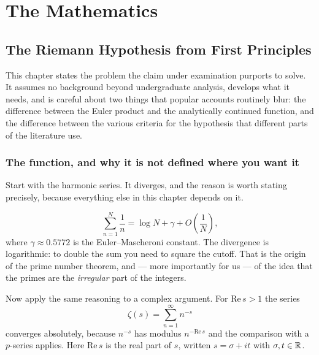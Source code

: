 
\part{The Mathematics}
\label{part:math}

\chapter{The Riemann Hypothesis from First Principles}
\label{ch:rh}

This chapter states the problem the claim under examination purports to solve.
It assumes no background beyond undergraduate analysis, develops what it needs,
and is careful about two things that popular accounts routinely blur: the
difference between the Euler product and the analytically continued function,
and the difference between the various criteria for the hypothesis that different
parts of the literature use.

\section{The function, and why it is not defined where you want it}Start with the harmonic series. It diverges, and the reason is worth stating
precisely, because everything else in this chapter depends on it.

\begin{equation}
\sum_{n=1}^{N} \frac{1}{n} = \log N + \gamma + O\!\left(\frac{1}{N}\right),
\label{eq:harmonic}
\end{equation}
where $\gamma \approx 0.5772$ is the Euler--Mascheroni constant. The
divergence is logarithmic: to double the sum you need to square the cutoff.
That is the origin of the prime number theorem, and --- more importantly for
us --- of the idea that the primes are the \emph{irregular} part of the integers.

Now apply the same reasoning to a complex argument. For $\mathrm{Re}\,  s > 1$ the series
\begin{equation}
\zeta(s) = \sum_{n=1}^{\infty} n^{-s}
\label{eq:zeta-series}
\end{equation}
converges absolutely, because $n^{-s}$ has modulus $n^{-\mathrm{Re}\,  s}$ and the
comparison with a $p$-series applies. Here $\mathrm{Re}\,  s$ is the real part of $s$,
written $s = \sigma + it$ with $\sigma, t \in \mathbb{R}$.

